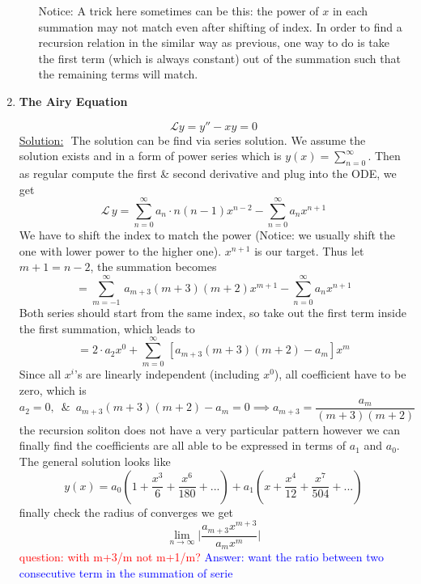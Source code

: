 \documentclass[10pt]{article}
\newenvironment{changemargin}[2]{%
  \begin{list}{}{%
    \setlength{\topsep}{0pt}%
    \setlength{\leftmargin}{#1}%
    \setlength{\rightmargin}{#2}%
    \setlength{\listparindent}{\parindent}%
    \setlength{\itemindent}{\parindent}%
    \setlength{\parsep}{\parskip}%
  }%
  \item[]}{\end{list}}
\begin{document}
\begin{changemargin}{-0.125in}{0in}
\begin{enumerate}
\begin{enumerate}
	   \begin{tcolorbox}[notitle,boxrule=0pt,colback=orange!20,colframe=blue!20]
	   Notice: A trick here sometimes can be this: the power of $x$ in each summation may not match even after shifting of index. In order to find a recursion relation in the similar way as previous, one way to do is take the first term (which is always constant) out of the summation such that the remaining terms will match. 
	   \end{tcolorbox}
	   
	  \end{enumerate}
	  
	  \item \textbf{The Airy Equation} 
	  
	  \[
	  \mathcal {L} y = y'' - xy = 0
	  \]
	  \underline{Solution:} \,\,The solution can be find via series solution. We assume the solution exists and in a form of power series which is $y(x) = \sum^\infty_{n =0}$. Then as regular compute the first \& second derivative and plug into the ODE, we get 
	  \[
	  \mathcal{L}\,y = \sum^{\infty}_{n = 0}a_n\cdot n(n - 1)x^{n-2} - \sum^{\infty}_{n = 0}a_nx^{n+1}
	  \]
	  We have to shift the index to match the power (Notice: we usually shift the one with lower power to the higher one). $x^{n+1}$ is our target. Thus let $m + 1 = n-2$, the summation becomes 
	  \[
	  = \sum_{m = -1}^{\infty} \,a_{m+3} (m+3)(m+2)x^{m+1} - \sum^\infty_{n = 0}a_nx^{n+1}
	  \]
	  Both series should start from the same index, so take out the first term inside the first summation, which leads to 
	  \[
	   = 2\cdot a_2 x^0 + \sum^\infty_{m = 0} \, [a_{m+3} (m+3)(m+2) -  a_m]x^m
	  \]
	  Since all $x^i$'s are linearly independent (including $x^0$), all coefficient have to be zero, which is 
	  \[
	  a_2 = 0,\,\,\,\& \,\,\,a_{m+3} (m+3)(m+2) -  a_m = 0 \implies a_{m+3} = \frac{a_m}{(m+3)(m+2)}
	  \]
	  the recursion soliton does not have a very particular pattern however we can finally find the coefficients are all able to be expressed in terms of $a_1$ and $a_0$. The general solution looks like 
	  \[
	  y(x) = a_0(1 + \frac{x^3}{6} + \frac{x^6}{180} + ...) + a_1(x + \frac{x^4}{12} + \frac{x^7}{504} + ...)
	  \]
	  finally check the radius of converges we get 
	  \[
	  \lim_{n \rightarrow \infty} \big| \frac{a_{m+3}x^{m+3}}{a_m x^m}\big|
	  \]
	  \textcolor{red}{question: with m+3/m not m+1/m? }\textcolor{blue}{Answer: want the ratio between two consecutive term in the summation of serie}
	 
	  
	  \medskip
	  

\end{enumerate}
\end{changemargin}
\end{document}
